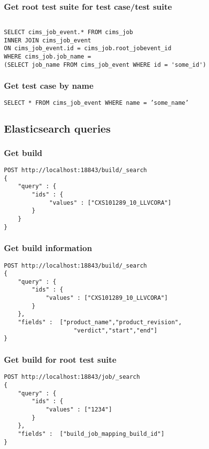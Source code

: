 \subsubsection*{Get root test suite for test case/test suite}
\label{q:getrootts}
\begin{verbatim}

SELECT cims_job_event.* FROM cims_job
INNER JOIN cims_job_event 
ON cims_job_event.id = cims_job.root_jobevent_id
WHERE cims_job.job_name =
(SELECT job_name FROM cims_job_event WHERE id = 'some_id')

\end{verbatim}

\subsubsection*{Get test case by name}
\label{q:gettcbyname}
{\tt SELECT * FROM cims\_job\_event WHERE name = 'some\_name' }
\subsection*{Elasticsearch queries}
\subsubsection*{Get build}
\label{q:getbuildEs}
\begin{verbatim}
POST http://localhost:18843/build/_search
{ 
    "query" : {
        "ids" : { 
             "values" : ["CXS101289_10_LLVCORA"]
        }
    }
}
\end{verbatim}


\subsubsection*{Get build information}
\label{q:getbuildInfoEs}
\begin{verbatim}
POST http://localhost:18843/build/_search
{ 
    "query" : {
        "ids" : { 
            "values" : ["CXS101289_10_LLVCORA"]
        }
    },
    "fields" :  ["product_name","product_revision",
                    "verdict","start","end"]
}
\end{verbatim}

\subsubsection*{Get build for root test suite}
\begin{verbatim}
POST http://localhost:18843/job/_search
{ 
    "query" : {
        "ids" : { 
            "values" : ["1234"]
        }
    },
    "fields" :  ["build_job_mapping_build_id"]
}
\end{verbatim}

